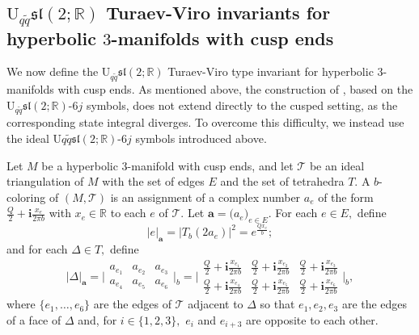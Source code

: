 \documentclass[11pt]{article}
\theoremstyle{remark}
\theoremstyle{remark}
\numberwithin{equation}{section}
\begin{document}
\subsection{$\mathrm {U}_{q\tilde q}\mathfrak{sl}(2;\mathbb R)$ Turaev-Viro invariants for  hyperbolic  $3$-manifolds with cusp ends}
We now define the $\mathrm {U}_{q\tilde q}\mathfrak{sl}(2;\mathbb R)$ Turaev-Viro type invariant for hyperbolic $3$-manifolds with cusp ends.  As mentioned above, the construction of \cite{LMSWY}, based on the $\mathrm{U}_{q\tilde q}\mathfrak{sl}(2;\mathbb R)$-$6j$ symbols, does not extend directly to the cusped setting, as the corresponding state integral diverges. To overcome this difficulty, we instead use the ideal $\mathrm{U}{q\tilde q}\mathfrak{sl}(2;\mathbb R)$-$6j$ symbols introduced above.





Let  $M$ be a  hyperbolic $3$-manifold with cusp ends, and let $\mathcal T$ be an ideal triangulation of $M$ with the set of edges $E$ and the set of tetrahedra $T.$ A $b$-coloring of $(M,\mathcal T)$ is an assignment of a complex number $a_e$ of the form $\frac{Q}{2}+\mathbf i\frac{x_e}{2\pi b}$ with $x_e\in\mathbb R$ to each  $e$ of $\mathcal T.$ Let $\boldsymbol a=\big(a_e\big)_{e\in E}.$ For each $e\in E,$ define
\begin{equation}
  |e|_{\boldsymbol a}=|T_b(2a_e)|^2=e^{\frac{Qx_e}{b}};
\end{equation}
and for each $\Delta\in T,$ define
$$|\Delta|_{\boldsymbol a}=\bigg|\begin{matrix} a_{e_1} & a_{e_2} & a_{e_3} \\ a_{e_4} & a_{e_5} & a_{e_6} \end{matrix} \bigg|_b=\bigg|\begin{matrix} \frac{Q}{2}+\mathbf i\frac{x_{e_1}}{2\pi b} & \frac{Q}{2}+\mathbf i\frac{x_{e_2}}{2\pi b} & \frac{Q}{2}+\mathbf i\frac{x_{e_3}}{2\pi b} \\ \frac{Q}{2}+\mathbf i\frac{x_{e_4}}{2\pi b} & \frac{Q}{2}+\mathbf i\frac{x_{e_5}}{2\pi b} & \frac{Q}{2}+\mathbf i\frac{x_{e_6}}{2\pi b} \end{matrix} \bigg|_b,$$
where $\{e_1,\dots,e_6\}$ are the edges of $\mathcal T$ adjacent to $\Delta$ so that $e_1,e_2,e_3$ are the edges of a face of $\Delta$ and, for $i\in\{1,2,3\},$  $e_i$ and $e_{i+3}$ are opposite to each other. 
\end{document}
